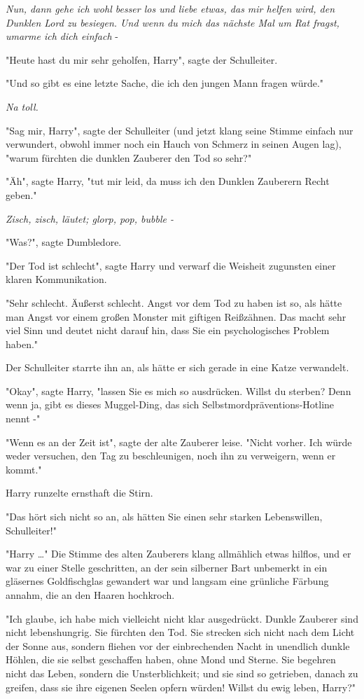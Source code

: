 {\emph{Nun, dann gehe ich wohl besser los und liebe etwas, das mir helfen wird, den Dunklen Lord zu besiegen. Und wenn du mich das nächste Mal um Rat fragst, umarme ich dich einfach} -

"Heute hast du mir sehr geholfen, Harry", sagte der Schulleiter.

"Und so gibt es eine letzte Sache, die ich den jungen Mann fragen würde."

\emph{Na toll.}

"Sag mir, Harry", sagte der Schulleiter (und jetzt klang seine Stimme einfach nur verwundert, obwohl immer noch ein Hauch von Schmerz in seinen Augen lag), "warum fürchten die dunklen Zauberer den Tod so sehr?"

"Äh", sagte Harry, "tut mir leid, da muss ich den Dunklen Zauberern Recht geben."

\emph{Zisch, zisch, läutet; glorp, pop, bubble -}

"Was?", sagte Dumbledore.

"Der Tod ist schlecht", sagte Harry und verwarf die Weisheit zugunsten einer klaren Kommunikation.

"Sehr schlecht. Äußerst schlecht. Angst vor dem Tod zu haben ist so, als hätte man Angst vor einem großen Monster mit giftigen Reißzähnen. Das macht sehr viel Sinn und deutet nicht darauf hin, dass Sie ein psychologisches Problem haben."

Der Schulleiter starrte ihn an, als hätte er sich gerade in eine Katze verwandelt.

"Okay", sagte Harry, "lassen Sie es mich so ausdrücken. Willst du sterben? Denn wenn ja, gibt es dieses Muggel-Ding, das sich Selbstmordpräventions-Hotline nennt -"

"Wenn es an der Zeit ist", sagte der alte Zauberer leise. "Nicht vorher. Ich würde weder versuchen, den Tag zu beschleunigen, noch ihn zu verweigern, wenn er kommt."

Harry runzelte ernsthaft die Stirn.

"Das hört sich nicht so an, als hätten Sie einen sehr starken Lebenswillen, Schulleiter!"

"Harry …" Die Stimme des alten Zauberers klang allmählich etwas hilflos, und er war zu einer Stelle geschritten, an der sein silberner Bart unbemerkt in ein gläsernes Goldfischglas gewandert war und langsam eine grünliche Färbung annahm, die an den Haaren hochkroch.

"Ich glaube, ich habe mich vielleicht nicht klar ausgedrückt. Dunkle Zauberer sind nicht lebenshungrig. Sie fürchten den Tod. Sie strecken sich nicht nach dem Licht der Sonne aus, sondern fliehen vor der einbrechenden Nacht in unendlich dunkle Höhlen, die sie selbst geschaffen haben, ohne Mond und Sterne. Sie begehren nicht das Leben, sondern die Unsterblichkeit; und sie sind so getrieben, danach zu greifen, dass sie ihre eigenen Seelen opfern würden! Willst du ewig leben, Harry?"

}

